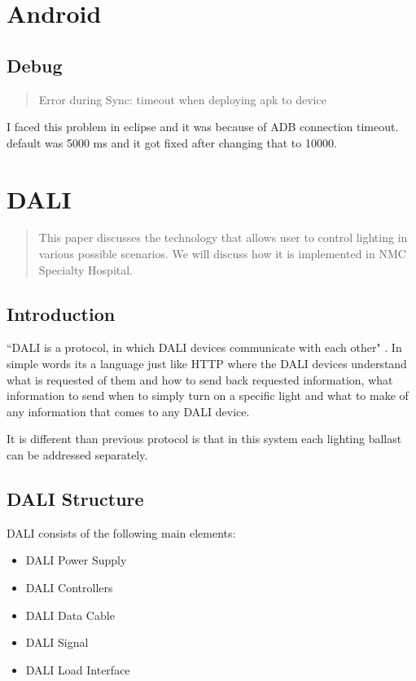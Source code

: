\documentclass{article}
\begin{document}
\section{Android}
\subsection{Debug}
\begin{quote}
Error during Sync: timeout when deploying apk to device 
\end{quote}
I faced this problem in eclipse and it was because of ADB connection timeout.
default was 5000 ms and it got fixed after changing that to 10000. \cite{captain}
	
	
\section{DALI}	

\begin{quotation}
This paper discusses the technology that allows user to control lighting in various possible scenarios. We will discuss how it is implemented in NMC Specialty Hospital.
\end{quotation}

\subsection{Introduction}
``DALI is a protocol, in which DALI devices communicate with each other" \cite{dali}. In simple words its a language just like HTTP where the DALI devices understand what is requested of them and how to send back requested information, what information to send when to simply turn on a specific light and what to make of any information that comes to any DALI device.

It is different than previous protocol is that in this system each lighting ballast can be addressed separately. 



\subsection{DALI Structure}
DALI consists of the following main elements:
\begin{itemize}
\item DALI Power Supply
\item DALI Controllers
\item DALI Data Cable
\item DALI Signal 
\item DALI Load Interface
\end{itemize}
\end{document}
